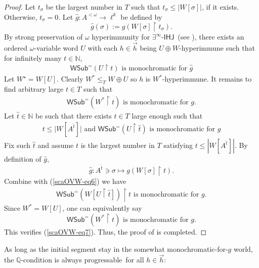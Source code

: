 \documentclass{article}
\def\msf{\mathsf}
\def\h{\hat}
\def\uhr{\upharpoonright}
\def\wsamelong{\mathsf{WSub}^{=}}
\def\progressable{progressable}
\def\wHJ{$\exists^\infty$-$\msf{IHJ}$}
\def\QQ{\mathbb{Q}}
\newcommand{\NN}[0]{\mathbb{N}}
\numberwithin{theorem}{section}
\theoremstyle{definition}
\begin{document}
\begin{proof}
Let $t_\sigma$ be the largest number in $T$
such that $t_\sigma\leq |W[\sigma]|$, if it exists. Otherwise, $t_\sigma = 0$.
Let $\h g : A^{<\omega} \to \ell^k$ be defined by
$$
\h g(\sigma):= g(W[\sigma]\uhr t_\sigma).
$$
By strong preservation of $\omega$ hyperimmunity
for \wHJ\ (see  ),
there exists an ordered $\omega$-variable word $U$ with
each $h\in\vec{h}$ being $ U\oplus W $-hyperimmune such that
for infinitely many $t\in\NN$,
\begin{align}\nonumber
\wsamelong(U\uhr t)\text{ is monochromatic for $\h g$}
\end{align}
Let $W^\star = W[U]$. %
Clearly $W^*\leq_T W\oplus U$ so $h$ is $W^*$-hyperimmune.
It remains to find arbitrary large $t\in T$
such that
\begin{align}
\label{scaOVW-eq7}
\wsamelong(W^*\uhr t)
\text{ is monochromatic for $g$.}
\end{align}
Let $\h t\in\NN$ be such that there exists $t\in T$ large enough
such that
\begin{align}\label{scaOVW-eq6}
t\leq \big|W[A^{\h t}]\big|\text{ and }\wsamelong(U\uhr \h t)\text{ is monochromatic for $\h g$}
\end{align}
Fix such $\h t$ and  assume $t$
is the largest number in $T$ satisfying  $t\leq |W[A^{\h t}]|$.
By definition of $\h g$,
$$
\h g:A^{  \h t  }\ni\sigma\mapsto g(W[\sigma]\uhr t).
$$
Combine with (\ref{scaOVW-eq6})
we have
\begin{align}\nonumber
\wsamelong(W[U\uhr \h t])\uhr t  \text{ is monochromatic for $g$.}
\end{align}
Since $W^*  = W[U]$, one can equivalently say
$$
\wsamelong(W^*\uhr t)\text{ is monochromatic for $g$.}
$$
This verifies (\ref{scaOVW-eq7}). Thus, the proof of  is completed.
\end{proof}

 As long as the initial segment stay in the
 somewhat monochromatic-for-$g$ world,
 the $\QQ$-condition is always \progressable\
 for all $h \in\vec{h}$:
\end{document}
